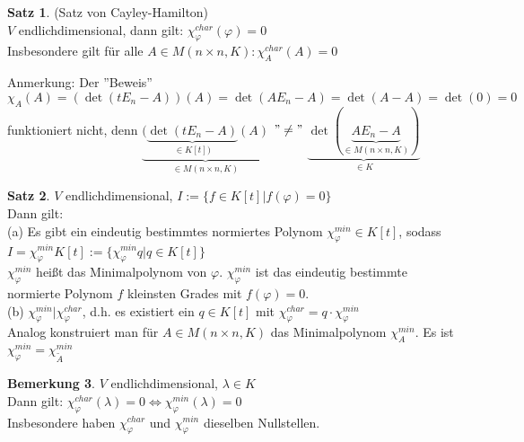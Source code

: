 \documentclass[10pt,a4paper,numbers=endperiod]{scrartcl}
\theoremstyle{definition}
\newtheorem{satz}{Satz}[section]
\newtheorem{bem}[satz]{Bemerkung}
\begin{document}
\begin{satz}
	(Satz von Cayley-Hamilton)\\
	$V$ endlichdimensional, dann gilt: $\chi_{\varphi}^{char} (\varphi) = 0$\\
	Insbesondere gilt für alle $A \in M(n \times n, K): \chi_A^{char} (A) = 0$
\end{satz}

Anmerkung: Der ''Beweis'' $\chi_A (A) = (\det(tE_n-A))(A) = \det(AE_n-A) = \det(A-A) = \det(0) = 0$ funktioniert nicht, denn $\underbrace{(\underbrace{\det(tE_n-A)}_{\in K[t])}(A)}_{\in M(n \times n,K)}$ $"\neq"$ $\underbrace{\det(\underbrace{AE_n-A}_{\in M(n \times n,K)})}_{\in K}$

\begin{satz}
	$V$ endlichdimensional, $I := \{f \in K[t]| f(\varphi) = 0\}$\\
	Dann gilt:\\
	(a) Es gibt ein eindeutig bestimmtes normiertes Polynom $\chi_{\varphi}^{min} \in K[t]$, sodass $I = \chi_{\varphi}^{min} K[t] := \{\chi_{\varphi}^{min} q| q \in K[t]\}$\\
	$\chi_{\varphi}^{min}$ heißt das Minimalpolynom von $\varphi$. $\chi_{\varphi}^{min}$ ist das eindeutig bestimmte normierte Polynom $f$ kleinsten Grades mit $f(\varphi) = 0$.\\
	(b) $\chi_{\varphi}^{min} | \chi_{\varphi}^{char}$, d.h. es existiert ein $q \in K[t]$ mit $\chi_{\varphi}^{char}= q \cdot \chi_{\varphi}^{min}$\\
	Analog konstruiert man für $A \in M(n \times n, K)$ das Minimalpolynom $\chi_A^{min}$. Es ist $\chi_{\varphi}^{min} = \chi_{\tilde{A}}^{min}$
\end{satz}

\begin{bem}
	$V$ endlichdimensional, $\lambda \in K$\\
	Dann gilt: $\chi_{\varphi}^{char} (\lambda) = 0 \Leftrightarrow \chi_{\varphi}^{min} (\lambda) = 0$\\
	Insbesondere haben $\chi_{\varphi}^{char}$ und $\chi_{\varphi}^{min}$ dieselben Nullstellen.
\end{bem}
\end{document}
